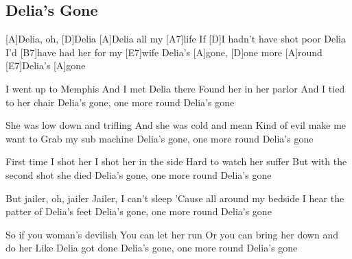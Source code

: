 \subsection*{Delia's Gone   }



\begin{guitar}


[A]Delia, oh, [D]Delia [A]Delia all my [A7]life
If [D]I hadn't have shot poor
Delia I'd [B7]have had her for my [E7]wife
Delia's [A]gone, [D]one more [A]round [E7]Delia's [A]gone


I went up to Memphis
And I met Delia there
Found her in her parlor
And I tied to her chair
Delia's gone, one more round Delia's gone

She was low down and trifling
And she was cold and mean
Kind of evil make me want to Grab my sub machine
Delia's gone, one more round Delia's gone

First time I shot her I shot her in the side
Hard to watch her suffer
But with the second shot she died
Delia's gone, one more round Delia's gone

But jailer, oh, jailer Jailer,
I can't sleep 'Cause all around my bedside
I hear the patter of Delia's feet
Delia's gone, one more round Delia's gone

So if you woman's devilish
You can let her run
Or you can bring her down and do her
Like Delia got done
Delia's gone, one more round Delia's gone

\end{guitar}
